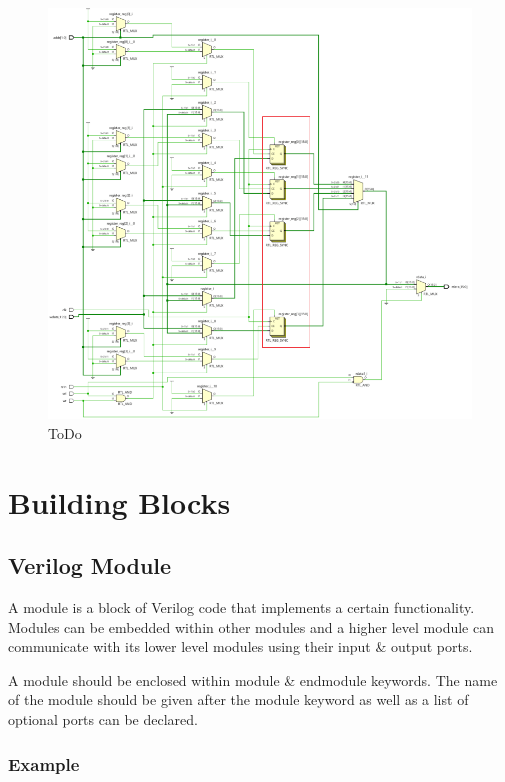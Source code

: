 \documentclass{article}
\begin{document}
	\begin{figure}[H]
		\includegraphics[width=\linewidth]{VerilogPics/figure_26.png}
		\caption{ToDo}
		\label{ToDo}
	\end{figure}

	\section{Building Blocks}	

	\subsection{Verilog Module}

	A module is a block of Verilog code that implements a certain functionality. Modules can be embedded within other modules and a higher level module can communicate with its lower level modules
	using their input \& output ports.

	A module should be enclosed within module \& endmodule keywords. The name of the module should be given after the module keyword as well as a list of optional ports can be declared.

	\subsubsection{Example}
\end{document}
